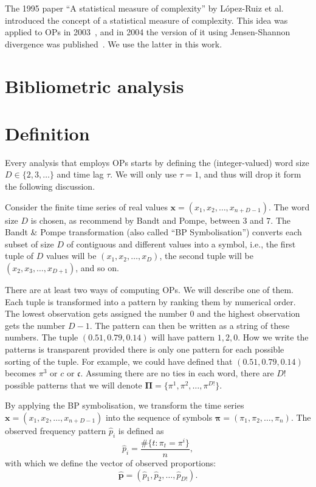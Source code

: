 The 1995 paper ``A statistical measure of complexity'' by López-Ruiz et al.~\cite{LopezRuiz1995} introduced the concept of a statistical measure of complexity. 
This idea was applied to OPs in 2003~\cite{Martin2003}, and in 2004 the version of it using Jensen-Shannon divergence was published~\cite{Lamberti2004}.
We use the latter in this work.

\section{Bibliometric analysis}

\section{Definition}

Every analysis that employs OPs starts by defining the (integer-valued) word size $D\in\{2,3,\dots\}$ and time lag $\tau$.
We will only use $\tau=1$, and thus will drop it form the following discussion.

Consider the finite time series of real values $\bm x=(x_1, x_2,\dots, x_{n+D-1})$. 
The word size $D$ is chosen, as recommend by Bandt and Pompe, between $3$ and $7$.
The Bandt \& Pompe transformation (also called ``BP Symbolisation'') converts each subset of size $D$ of contiguous and different values into a symbol, i.e.,
the first tuple of $D$ values will be $(x_1,x_2,\dots,x_{D})$, 
the second tuple will be $(x_2, x_3,\dots,x_{D+1})$, and so on.

There are at least two ways of computing OPs.
We will describe one of them.
Each tuple is transformed into a pattern by ranking them by numerical order. 
The lowest observation gets assigned the number $0$ and the highest observation gets the number $D-1$. 
The pattern can then be written as a string of these numbers. 
The tuple $(0.51, 0.79, 0.14)$ will have pattern $1,2,0$.
How we write the patterns is transparent provided there is only one pattern for each possible sorting of the tuple.
For example, we could have defined that $(0.51, 0.79, 0.14)$ becomes $\pi^3$ or $c$ or $\mathfrak{c}$.
Assuming there are no ties in each word, there are $D!$ possible patterns that we will denote $\bm\Pi=\{\pi^1,\pi^2,\dots,\pi^{D!}\}$.

By applying the BP symbolisation, we transform the time series 
$\bm x = (x_1, x_2, \dots, x_{n+D-1})$ into the sequence of symbols
$\bm \pi = (\pi_1, \pi_2,\dots, \pi_n)$.
The observed frequency pattern $\widehat{p}_i$ is defined as
$$
\widehat{p}_i=\frac{\#\{t : \pi_t = \pi^i\}}{n} ,
$$
with which we define the vector of observed proportions:
$$
\widehat{\bm p} = (\widehat{p}_1, \widehat{p}_2, \dots, \widehat{p}_{D!}).
$$



